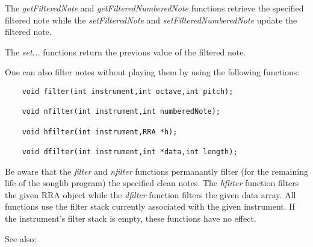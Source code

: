 \documentclass{article}
\begin{document}
The {\it getFilteredNote} and {\it getFilteredNumberedNote}
functions retrieve the
specified filtered note while the {\it setFilteredNote} and
{\it setFilteredNumberedNote} update the filtered note.

The {\it set...} functions return the previous value of the filtered note.

One can also filter notes without playing them by using the
following functions:

\begin{verbatim}
    void filter(int instrument,int octave,int pitch);

    void nfilter(int instrument,int numberedNote);

    void hfilter(int instrument,RRA *h);

    void dfilter(int instrument,int *data,int length);
\end{verbatim}

Be aware that the {\it filter} and {\it nfilter} functions
permanantly filter (for the remaining life of the songlib program)
the specified clean notes.
The {\it hfliter} function filters the given RRA object while the
{\it dfilter} function filters the given data array.
All functions
use the filter stack currently associated with the given 
instrument. If the instrument's filter stack is empty, these
functions have no effect.

See also: 
\end{document}
